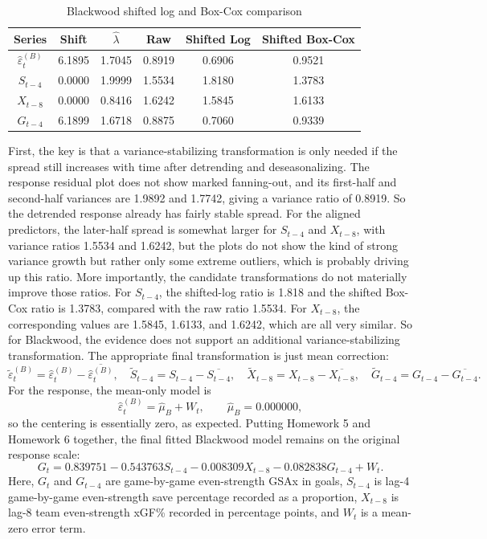 \documentclass[
  10pt,
]{extarticle}
\begin{document}
\begin{center}
\small
\begin{table}[H]

\caption{\label{tab:pproj-blackwood-transform-table}Blackwood shifted log and Box-Cox comparison}
\centering
\begin{tabular}[t]{cccccc}
\toprule
Series & Shift & $\hat{\lambda}$ & Raw & Shifted Log & Shifted Box-Cox\\
\midrule
$\widehat{\varepsilon}^{(B)}_t$ & 6.1895 & 1.7045 & 0.8919 & 0.6906 & 0.9521\\
$S_{t-4}$ & 0.0000 & 1.9999 & 1.5534 & 1.8180 & 1.3783\\
$X_{t-8}$ & 0.0000 & 0.8416 & 1.6242 & 1.5845 & 1.6133\\
$G_{t-4}$ & 6.1899 & 1.6718 & 0.8875 & 0.7060 & 0.9339\\
\bottomrule
\end{tabular}
\end{table}
\normalsize
\end{center}

First, the key is that a variance-stabilizing transformation is only needed if the spread still increases with time after detrending and deseasonalizing. The response residual plot does not show marked fanning-out, and its first-half and second-half variances are 1.9892 and 1.7742, giving a variance ratio of 0.8919. So the detrended response already has fairly stable spread. For the aligned predictors, the later-half spread is somewhat larger for \(S_{t-4}\) and \(X_{t-8}\), with variance ratios 1.5534 and 1.6242, but the plots do not show the kind of strong variance growth but rather only some extreme outliers, which is probably driving up this ratio. More importantly, the candidate transformations do not materially improve those ratios. For \(S_{t-4}\), the shifted-log ratio is 1.818 and the shifted Box-Cox ratio is 1.3783, compared with the raw ratio 1.5534. For \(X_{t-8}\), the corresponding values are 1.5845, 1.6133, and 1.6242, which are all very similar. So for Blackwood, the evidence does not support an additional variance-stabilizing transformation. The appropriate final transformation is just mean correction:
\[
\widetilde{\varepsilon}^{(B)}_t = \widehat{\varepsilon}^{(B)}_t - \overline{\widehat{\varepsilon}^{(B)}_t},
\quad
\widetilde{S}_{t-4} = S_{t-4} - \overline{S_{t-4}},
\quad
\widetilde{X}_{t-8} = X_{t-8} - \overline{X_{t-8}},
\quad
\widetilde{G}_{t-4} = G_{t-4} - \overline{G_{t-4}}.
\]
For the response, the mean-only model is
\[
\widehat{\varepsilon}^{(B)}_t = \hat{\mu}_B + W_t,
\qquad
\hat{\mu}_B = 0.000000,
\]
so the centering is essentially zero, as expected. Putting Homework 5 and Homework 6 together, the final fitted Blackwood model remains on the original response scale:
\[
G_t = 0.839751
 -  0.543763 S_{t-4}
 -  0.008309 X_{t-8}
 -  0.082838 G_{t-4}
 + W_t.
\]
Here, \(G_t\) and \(G_{t-4}\) are game-by-game even-strength GSAx in goals, \(S_{t-4}\) is lag-4 game-by-game even-strength save percentage recorded as a proportion, \(X_{t-8}\) is lag-8 team even-strength xGF\% recorded in percentage points, and \(W_t\) is a mean-zero error term.
\end{document}
